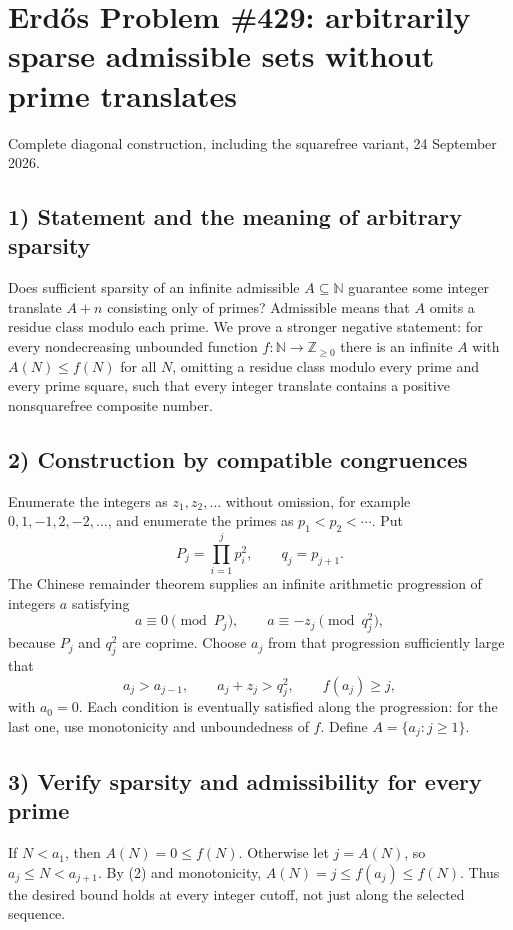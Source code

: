 \section{Erd\H{o}s Problem \#429: arbitrarily sparse admissible sets without prime translates}
\noindent Complete diagonal construction, including the squarefree variant, 24 September 2026.

\subsection*{1) Statement and the meaning of arbitrary sparsity}
Does sufficient sparsity of an infinite admissible $A\subseteq\mathbb N$ guarantee some integer translate $A+n$ consisting only of primes? Admissible means that $A$ omits a residue class modulo each prime. We prove a stronger negative statement: for every nondecreasing unbounded function $f:\mathbb N\to\mathbb Z_{\ge0}$ there is an infinite $A$ with $A(N)\le f(N)$ for all $N$, omitting a residue class modulo every prime and every prime square, such that every integer translate contains a positive nonsquarefree composite number.

\subsection*{2) Construction by compatible congruences}
Enumerate the integers as $z_1,z_2,\ldots$ without omission, for example $0,1,-1,2,-2,\ldots$, and enumerate the primes as $p_1<p_2<\cdots$. Put
\[P_j=\prod_{i=1}^j p_i^2,\qquad q_j=p_{j+1}.
\]
The Chinese remainder theorem supplies an infinite arithmetic progression of integers $a$ satisfying
\[a\equiv0\pmod{P_j},\qquad a\equiv-z_j\pmod{q_j^2},\tag{1}\]
because $P_j$ and $q_j^2$ are coprime. Choose $a_j$ from that progression sufficiently large that
\[a_j>a_{j-1},\qquad a_j+z_j>q_j^2,\qquad f(a_j)\ge j,
\tag{2}\]
with $a_0=0$. Each condition is eventually satisfied along the progression: for the last one, use monotonicity and unboundedness of $f$. Define $A=\{a_j:j\ge1\}$.

\subsection*{3) Verify sparsity and admissibility for every prime}
If $N<a_1$, then $A(N)=0\le f(N)$. Otherwise let $j=A(N)$, so $a_j\le N<a_{j+1}$. By (2) and monotonicity, $A(N)=j\le f(a_j)\le f(N)$. Thus the desired bound holds at every integer cutoff, not just along the selected sequence.

